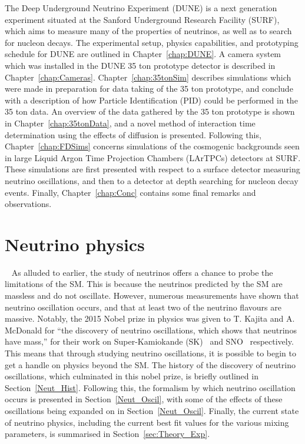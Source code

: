 The Deep Underground Neutrino Experiment (DUNE) is a next generation experiment situated at the Sanford Underground Research Facility (SURF), which aims to measure many of the properties of neutrinos, as well as to search for nucleon decays. The experimental setup, physics capabilities, and prototyping schedule for DUNE are outlined in Chapter~\ref{chap:DUNE}. A camera system which was installed in the DUNE 35 ton prototype detector is described in Chapter~\ref{chap:Cameras}. Chapter~\ref{chap:35tonSim} describes simulations which were made in preparation for data taking of the 35 ton prototype, and conclude with a description of how Particle Identification (PID) could be performed in the 35 ton data. An overview of the data gathered by the 35 ton prototype is shown in Chapter~\ref{chap:35tonData}, and a novel method of interaction time determination using the effects of diffusion is presented. Following this, Chapter~\ref{chap:FDSims} concerns simulations of the cosmogenic backgrounds seen in large Liquid Argon Time Projection Chambers (LArTPCs) detectors at SURF. These simulations are first presented with respect to a surface detector measuring neutrino oscillations, and then to a detector at depth searching for nucleon decay events. Finally, Chapter~\ref{chap:Conc} contains some final remarks and observations. \\

\section{Neutrino physics} ~\label{sec:NeutPhys}  %
As alluded to earlier, the study of neutrinos offers a chance to probe the limitations of the SM. This is because the neutrinos predicted by the SM are massless and do not oscillate. However, numerous measurements have shown that neutrino oscillation occurs, and that at least two of the neutrino flavours are massive. Notably, the 2015 Nobel prize in physics was given to T. Kajita and A. McDonald for ``the discovery of neutrino oscillations, which shows that neutrinos have mass,'' for their work on Super-Kamiokande (SK)~\citep{PhysRevLett.81.1562} and SNO~\citep{PhysRevLett.89.011301} respectively. This means that through studying neutrino oscillations, it is possible to begin to get a handle on physics beyond the SM. The history of the discovery of neutrino oscillations, which culminated in this nobel prize, is briefly outlined in Section~\ref{Neut_Hist}. Following this, the formalism by which neutrino oscillation occurs is presented in Section~\ref{Neut_Oscil}, with some of the effects of these oscillations being expanded on in Section~\ref{Neut_Oscil}. Finally, the current state of neutrino physics, including the current best fit values for the various mixing parameters, is summarised in Section~\ref{sec:Theory_Exp}. \\


